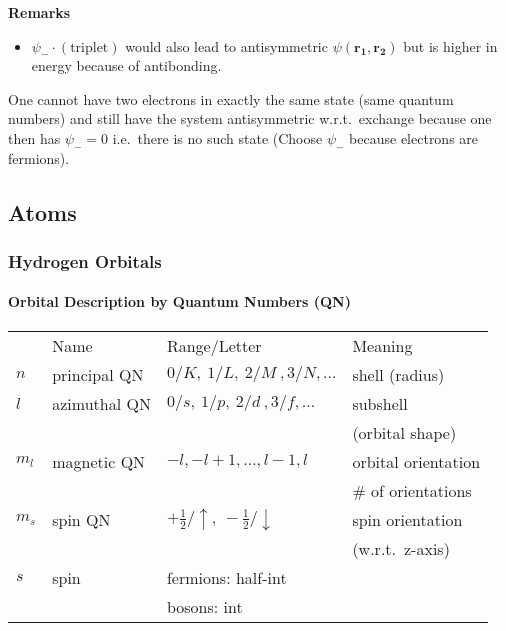 \newpar{}
\textbf{Remarks}
\begin{itemize}
    \item $\psi_{-}\cdot \left(\text{triplet}\right)$ would also lead to antisymmetric $\psi(\mathbf{r_1},\mathbf{r_2})$ but is higher in energy because of antibonding.
\end{itemize}

\newpar{}

One cannot have two electrons in exactly the same state (same quantum numbers) and still have the system antisymmetric w.r.t.\ exchange because one then has $\psi_{-}=0$ i.e.\ there is no such state (Choose $\psi_{-}$ because electrons are fermions).

\subsection{Atoms}
\subsubsection{Hydrogen Orbitals}
\paragraph{Orbital Description by Quantum Numbers (QN)}
\renewcommand{\arraystretch}{1.1}
\setlength{\oldtabcolsep}{\tabcolsep}\setlength\tabcolsep{3pt}
{\small     %
    \begin{tabularx}{\linewidth}{@{}llll@{}}
              & Name         & Range/Letter                                      & Meaning             \\
        $n$   & principal QN & $0/K,\:1/L,\:2/M\:,3/N,\dots$                     & shell (radius)      \\
        $l$   & azimuthal QN & $0/s,\:1/p,\:2/d\:,3/f,\dots$                     & subshell            \\
              &              &                                                   & (orbital shape)     \\
        $m_l$ & magnetic QN  & $-l,-l+1,\dots,l-1,l$                             & orbital orientation \\
              &              &                                                   & \# of orientations  \\
        $m_s$ & spin QN      & $+\frac{1}{2}/\uparrow,\:-\frac{1}{2}/\downarrow$ & spin orientation    \\
              &              &                                                   & (w.r.t.\ z-axis)    \\
        $s$   & spin         & fermions: half-int                                &                     \\
              &              & bosons: int                                       &
    \end{tabularx}
}           %
\renewcommand{\arraystretch}{1}
\setlength{\tabcolsep}{\oldtabcolsep}

